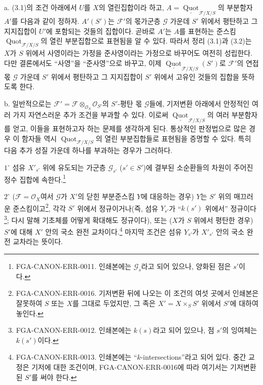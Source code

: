 
\noindent a. (3.1)의 조건 아래에서 $U$를 $X$의 열린집합이라 하고,
$A=\underline{\operatorname{Quot}}_{\mathcal F/X/S}$의 부분함자 $A'$를
다음과 같이 정하자. $A'(S')$는 $\mathcal F'$의 몫가군층 $\mathcal G$
가운데 $S'$ 위에서 평탄하고 그 지지집합이 $U'$에 포함되는 것들의
집합이다. 곧바로 $A'$는 $A$를 표현하는 준스킴
$\operatorname{Quot}_{\mathcal F/X/S}$의 열린 부분집합으로 표현됨을
알 수 있다. 따라서 정리 (3.1)과 (3.2)는
$X$가 $S$ 위에서 사영이라는 가정을 준사영이라는 가정으로 바꾸어도
여전히 성립한다. 다만 결론에서도 ``사영''을 ``준사영''으로 바꾸고,
이제 $\underline{\operatorname{Quot}}_{\mathcal F/X/S}(S')$로
$\mathcal F'$의 연접 몫 $\mathcal G$ 가운데 $S'$ 위에서 평탄하고
그 지지집합이 $S'$ 위에서 고유인 것들의 집합을 뜻하도록 한다.

\medskip
\noindent b. 일반적으로는
$\mathcal F'=\mathcal F\otimes_{\mathcal O_S}\mathcal O_{S'}$의
$S'$-평탄 몫 $\mathcal G$들에, 기저변환 아래에서 안정적인 여러 가지
자연스러운 추가 조건을 부과할 수 있다. 이로써
$\underline{\operatorname{Quot}}_{\mathcal F/X/S}$의 여러 부분함자를
얻고, 이들을 표현하고자 하는 문제를 생각하게 된다. 통상적인 판정법으로
많은 경우 이 함자들 역시 $\operatorname{Quot}_{\mathcal F/X/S}$의
열린 부분집합들로 표현됨을 증명할 수 있다. 특히 다음 추가 성질 가운데
하나를 부과하는 경우가 그러하다.

\smallskip
\noindent $1^\circ$ 섬유 $X'_{s'}$ 위에 유도되는 가군층
$\mathcal G_{s'}$ ($s'\in S'$)에 결부된 소순환들의 차원이 주어진
정수 집합에 속한다.\footnote{FGA-CANON-ERR-0011. 인쇄본에는
$\mathcal G_s$라고 되어 있으나, 양화된 점은 $s'$이다.}

\smallskip
\noindent $2^\circ$ ($\mathcal F=\mathcal O_X$여서 $\mathcal G$가
$X'$의 닫힌 부분준스킴 $Y$에 대응하는 경우) $Y$는 $S'$ 위의 매끄러운
준스킴이고\footnote{FGA-CANON-ERR-0016. 기저변환 뒤에 나오는 이 조건의
여섯 곳에서 인쇄본은 잘못하여 $S$ 또는 $X$를 그대로 두었지만, 그 족은
$X'=X\times_SS'$ 위에서 $S'$에 대하여 놓인다.}, 각각 $S'$ 위에서
정규이거나(즉, 섬유 $Y_{s'}$가 ``$k(s')$ 위에서''
정규이다\footnote{FGA-CANON-ERR-0012. 인쇄본에는 $k(s)$라고 되어 있으나,
점 $s'$의 잉여체는 $k(s')$이다.}; 다시 말해 기초체를 어떻게 확대해도
정규이다), 또는 ($X$가 $S$ 위에서 평탄한 경우) $S'$에 대해 $X'$ 안의
국소 완전 교차이다.\footnote{FGA-CANON-ERR-0013. 인쇄본에는
``$k$-intersections''라고 되어 있다. 중간 교정은 기저에 대한 조건이며,
FGA-CANON-ERR-0016에 따라 여기서는 기저변환된 $S'$를 써야 한다.}
마지막 조건은 섬유 $Y_{s'}$가 $X'_{s'}$ 안의 국소 완전 교차라는 뜻이다.

